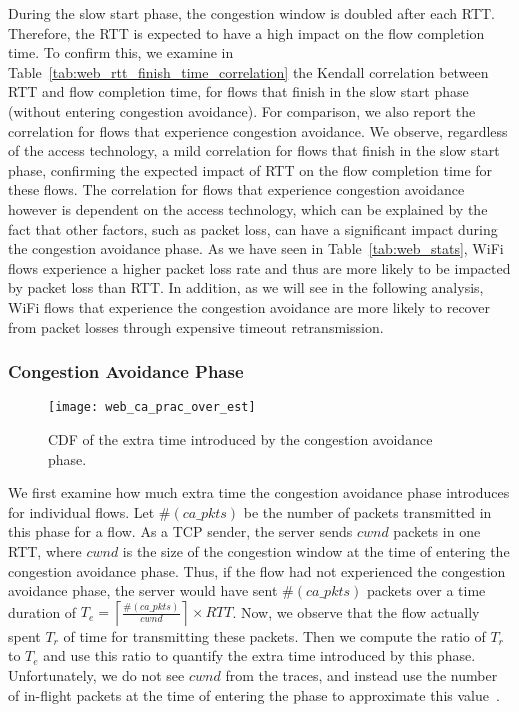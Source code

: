 During the slow start phase, the congestion window is doubled after each RTT. Therefore, the RTT is expected to have a high impact on the flow completion time. To confirm this, we examine in Table~\ref{tab:web_rtt_finish_time_correlation} the Kendall correlation between RTT and flow completion time, for flows that finish in the slow start phase (\ie without entering congestion avoidance). For comparison, we also report the correlation for flows that experience congestion avoidance. We observe, regardless of the access technology, a mild correlation for flows that finish in the slow start phase, confirming the expected impact of RTT on the flow completion time for these flows. The correlation for flows that experience congestion avoidance however is dependent on the access technology, which can be explained by the fact that other factors, such as packet loss, can have a significant impact during the congestion avoidance phase. As we have seen in Table~\ref{tab:web_stats}, WiFi flows experience a higher packet loss rate and thus are more likely to be impacted by packet loss than RTT. In addition, as we will see in the following analysis, WiFi flows that experience the congestion avoidance are more likely to recover from packet losses through expensive timeout retransmission.


\subsubsection{Congestion Avoidance Phase}

\begin{figure}[th]
\centering
\texttt{[image: web\_ca\_prac\_over\_est]}
\caption{CDF of the extra time introduced by the congestion avoidance phase.}
\label{fig:web_ca_round}
\end{figure}

We first examine how much extra time the congestion avoidance phase introduces for individual flows. Let $\#(ca\_pkts)$ be the number of packets transmitted in this phase for a flow. As a TCP sender, the server sends $cwnd$ packets in one RTT, where $cwnd$ is the size of the congestion window at the time of entering the congestion avoidance phase. Thus, if the flow had not experienced the congestion avoidance phase, the server would have sent $\#(ca\_pkts)$ packets over a time duration of $T_e =  \left \lceil{\frac{\#(ca\_pkts)}{cwnd}} \right \rceil  \times RTT$. Now, we observe that the flow actually spent $T_r$ of time for transmitting these packets. Then we compute the ratio of  $T_r$ to $T_e$ and use this ratio to quantify the extra time introduced by this phase. Unfortunately, we do not see $cwnd$ from the traces, and instead use the number of in-flight packets at the time of entering the phase to approximate this value~\cite{rfc56812009tcp}. 
 
